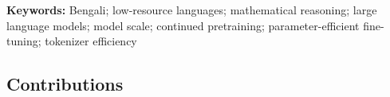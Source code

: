 %

\vspace{0.5em}
\noindent\textbf{Keywords:} Bengali; low-resource languages; mathematical
reasoning; large language models; model scale; continued pretraining;
parameter-efficient fine-tuning; tokenizer efficiency





\subsection*{Contributions}

